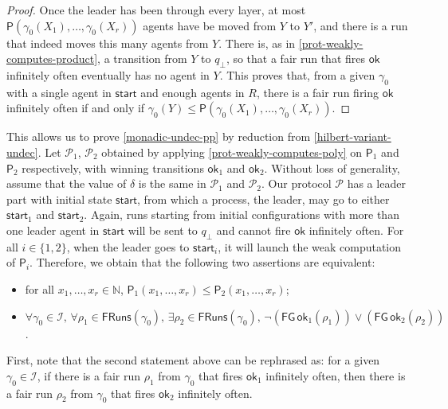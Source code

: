 \documentclass[10pt,a4paper]{article}
\let\mathbb\mathds
\renewcommand{\leq}{\leqslant}
\newcommand{\nats}{\mathbb{N}}
\newcommand{\set}[1]{\{#1\}}
\newcommand{\prot}{\mathcal{P}}
\newcommand{\atrace}{\run}
\newcommand{\fairrunsfrom}[1]{\mathsf{FRuns}(#1)}
\newcommand{\config}{\gamma}
\newcommand{\initialconfigs}{\mathcal{I}}
\newcommand{\run}{\rho}
\newcommand*{\apoly}{\mathsf{P}}
\newcommand*{\startstate}{\mathsf{start}}
\newcommand*{\statex}[1]{X_{#1}}
\newcommand*{\okaction}{\mathsf{ok}}
\newcommand{\statey}{Y}
\newcommand{\maxexp}{\delta}
\newcommand{\reservoirstate}{R}
\newcommand{\PP}{\mathcal{P}}                  %
\newcommand{\ltlglobally}{\mathsf{G}}
\newcommand{\ltlfinally}{\mathsf{F}}
\newcommand{\cheatstate}{q_\bot}
\begin{document}
\begin{toappendix}
\begin{proof}
		Once the leader has been through every layer, at most \(\apoly(\config_0(\statex{1}), \dots, \config_0(\statex{r}))\) agents have be moved from \(\statey\) to \(\statey'\), and there is a run that indeed moves this many agents from \(\statey\).
		There is, as in \cref{prot-weakly-computes-product}, a transition from \(\statey\) to \(\cheatstate\), so that a fair run that fires \(\okaction\) infinitely often eventually has no agent in \(\statey\).
		This proves that, from a given \(\config_0\) with a single agent in \(\startstate\) and enough agents in \(\reservoirstate\), there is a fair run firing \(\okaction\) infinitely often if and only if \(\config_0(\statey) \leq \apoly(\config_0(\statex{1}), \dots, \config_0(\statex{r}))\).
	\end{proof}

	This allows us to prove \cref{monadic-undec-pp} by reduction from \cref{hilbert-variant-undec}.
	Let \(\PP_1\), \(\PP_2\) obtained by applying \cref{prot-weakly-computes-poly} on \(\apoly_1\) and \(\apoly_2\) respectively, with winning transitions \(\okaction_1\) and \(\okaction_2\).
	Without loss of generality, assume that the value of \(\maxexp\) is the same in \(\prot_1\) and \(\prot_2\).
	Our protocol \(\prot\) has a leader part with initial state \(\startstate\), from which a process, the leader, may go to either \(\startstate_1\) and \(\startstate_2\).
	Again, runs starting from initial configurations with more than one leader agent in \(\startstate\) will be sent to \(\cheatstate\) and cannot fire \(\okaction\) infinitely often.
	For all \(i \in \set{1,2}\), when the leader goes to \(\startstate_i\), it will launch the weak computation of \(\apoly_i\).
	Therefore, we obtain that the following two assertions are equivalent:
	\begin{itemize}[noitemsep,topsep=0pt,parsep=0pt,partopsep=0pt]
		\item for all \(x_1, \dots, x_r \in \nats\), \(\apoly_1(x_1, \dots, x_r) \leq \apoly_2(x_1, \dots, x_r)\);
		\item \(\forall \config_0 \in \initialconfigs, \, \forall \atrace_1 \in \fairrunsfrom{\config_0}, \, \exists \atrace_2 \in \fairrunsfrom{\config_0}, \, \neg (\ltlfinally \ltlglobally \,\okaction_1(\atrace_1)) \lor (\ltlfinally \ltlglobally \,\okaction_2(\atrace_2))\).
	\end{itemize}
	First, note that the second statement above can be rephrased as: for a given \(\config_0 \in \initialconfigs\), if there is a fair run \(\run_1\) from \(\config_0\) that fires \(\okaction_1\) infinitely often, then there is a fair run \(\run_2\) from \(\config_0\) that fires \(\okaction_2\) infinitely often.


\end{toappendix}
\end{document}

